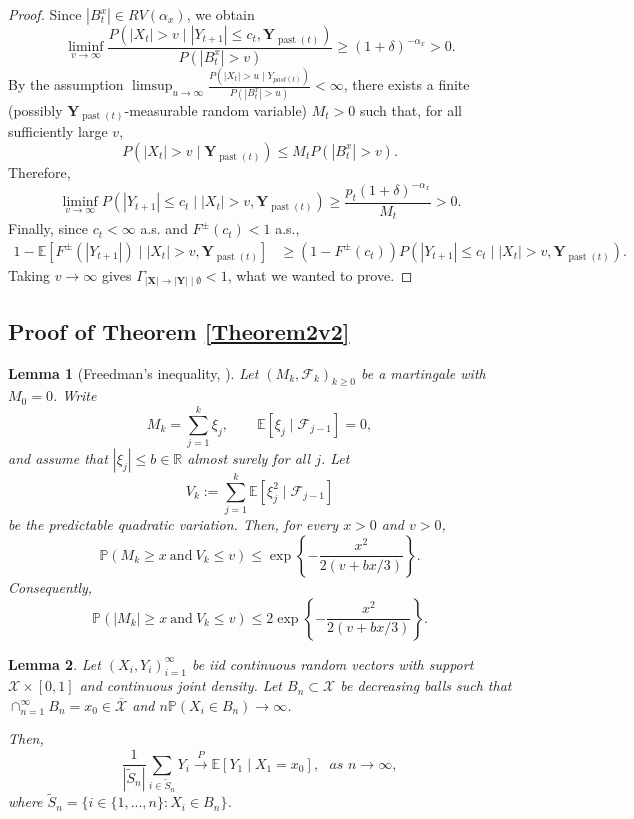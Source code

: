 \documentclass[a4paper,11pt]{article}
\newtheorem{lemma}{Lemma}
\DeclareMathOperator{\past}{past}
\begin{document}
\begin{proof}
Since \(|B^x_t|\in RV(\alpha_x)\), we obtain
\[
\liminf_{v\to\infty}
\frac{
P(|X_t|>v\mid |Y_{t+1}|\leq c_t,\mathbf Y_{\past(t)})
}{
P(|B^x_t|>v)
}
\geq
(1+\delta)^{-\alpha_x}>0 .
\]
By the assumption \(
\limsup_{u\to\infty}
\frac{P(|X_t|>u\mid Y_{past(t)})}{P(|B_t^x|>u)}
<\infty
\), there exists a finite
(possibly \(\mathbf Y_{\past(t)}\)-measurable random variable) \(M_t>0\) such that, for all
sufficiently large \(v\),
\[
P(|X_t|>v\mid\mathbf Y_{\past(t)})
\leq
M_t P(|B^x_t|>v).
\]
Therefore,
\[
\liminf_{v\to\infty}
P(|Y_{t+1}|\leq c_t\mid |X_t|>v,\mathbf Y_{\past(t)})
\geq
\frac{p_t(1+\delta)^{-\alpha_x}}{M_t}
>0 .
\]
Finally, since \(c_t<\infty\) a.s. and \(F^\pm(c_t)<1\) a.s.,
\[
\begin{aligned}
1-
\mathbb E[
F^\pm(|Y_{t+1}|)\mid |X_t|>v,\mathbf Y_{\past(t)}]
&\geq
(1-F^\pm(c_t))
P(|Y_{t+1}|\leq c_t\mid |X_t|>v,\mathbf Y_{\past(t)}).
\end{aligned}
\]
Taking $v\to\infty$ gives \(
\Gamma_{|\mathbf X|\to|\mathbf Y|\mid\emptyset}<1
\), what we wanted to prove. 

\end{proof}



\newpage
\subsection{Proof of Theorem \ref{Theorem2v2}}
\label{Proof of Theorem 2v2}


\begin{lemma}[Freedman's inequality, \cite{freedman1975tail}]
\label{lemma:freedman}
Let \((M_k,\mathcal F_k)_{k\ge0}\) be a martingale with \(M_0=0\). Write
\[
    M_k=\sum_{j=1}^k \xi_j,
    \qquad
    \mathbb E[\xi_j\mid\mathcal F_{j-1}]=0,
\]
and assume that $    |\xi_j|\le b\in\mathbb{R}$ almost surely for all $j$. Let
\[
    V_k
    :=
    \sum_{j=1}^k
    \mathbb E[\xi_j^2\mid\mathcal F_{j-1}]
\]
be the predictable quadratic variation. Then, for every \(x>0\) and \(v>0\),
\[
    \mathbb P\left(
        M_k\ge x
        \ \text{and}\
        V_k\le v
    \right)
    \le
    \exp\left\{
        -\frac{x^2}{2(v+bx/3)}
    \right\}.
\]
Consequently,
\[
    \mathbb P\left(
        |M_k|\ge x
        \ \text{and}\
        V_k\le v
    \right)
    \le
    2\exp\left\{
        -\frac{x^2}{2(v+bx/3)}
    \right\}.
\]
\end{lemma}

\begin{lemma}
\label{Law_of_large_numbers_lemma}
Let $(X_i, Y_i)_{i=1}^{\infty}$ be iid continuous random vectors with support $\mathcal{X}\times [0, 1]$ and continuous joint density. Let $B_n\subset \mathcal{X}$ be decreasing balls such that $\cap_{n=1}^\infty B_n= x_0\in\overline{\mathcal{X}}$ and  $n\mathbb{P}(X_i\in B_n)\to\infty$. 

Then, 
$$
\frac{1}{|\tilde{S}_n|}\sum_{i\in \tilde{S}_n}Y_i \overset{P}{\to} \mathbb{E}[Y_1\mid X_1=x_0], \,\,\,\,as \,\,n\to\infty, 
$$
where $\tilde{S}_n = \{i \in \{1, ..., n\}: X_i\in B_n\}$. 
\end{lemma}
\end{document}
